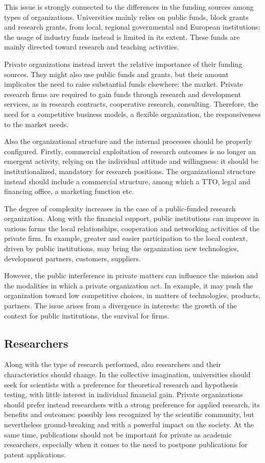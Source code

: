 This issue is strongly connected to the differences in the funding sources among types of organizations. Universities mainly relies on public funds, block grants and research grants, from local, regional governmental and European institutions; the usage of industry funds instead is limited in its extent. These funds are mainly directed toward research and teaching activities. 

Private organizations instead invert the relative importance of their funding sources. They might also use public funds and grants, but their amount implicates the need to raise substantial funds elsewhere: the market. Private research firms are required to gain funds through research and development services, as in research contracts, cooperative research, consulting. Therefore, the need for a competitive business models, a flexible organization, the responsiveness to the market needs.

Also the organizational structure and the internal processes should be properly configured. Firstly, commercial exploitation of research outcomes is no longer an emergent activity, relying on the individual attitude and willingness: it should be institutionalized, mandatory for research positions. The organizational structure instead should include a commercial structure, among which a TTO, legal and financing office, a marketing function etc.

The degree of complexity increases in the case of a public-funded research organization. Along with the financial support, public institutions can improve in various forms the local relationships, cooperation and networking activities of the private firm. In example, greater and easier participation to the local context, driven by public institutions, may bring the organization new technologies, development partners, customers, suppliers.  

However, the public interference in private matters can influence the mission and the modalities in which a private organization act. In example, it may push the organization toward low competitive choices, in matters of technologies, products, partners. The issue arises from a divergence in interests: the growth of the context for public institutions, the survival for firms.  

\subsection{Researchers}

Along with the type of research performed, also researchers and their characteristics should change. In the collective imagination, universities should seek for scientists with a preference for theoretical research and hypothesis testing, with little interest in individual financial gain. Private organizations should prefer instead researchers with a strong preference for applied research, its benefits and outcomes: possibly less recognized by the scientific community, but nevertheless ground-breaking and with a powerful impact on the society. At the same time, publications should not be important for private as academic researchers, especially when it comes to the need to postpone publications for patent applications.  

